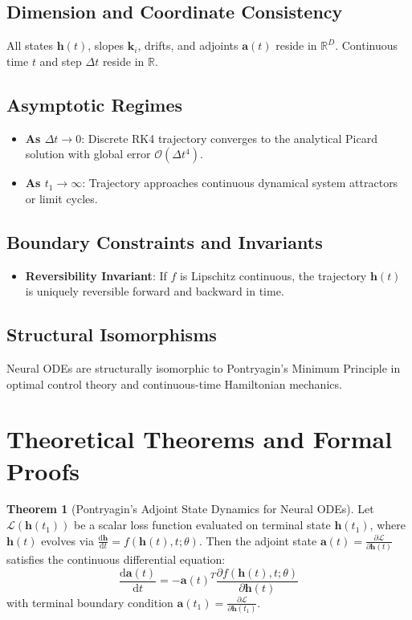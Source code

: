 \documentclass[11pt,a4paper]{article}
\theoremstyle{definition}
\newtheorem{theorem}{\textbf{Theorem}}[section]
\begin{document}
\subsection{Dimension and Coordinate Consistency}
All states $\mathbf{h}(t)$, slopes $\mathbf{k}_i$, drifts, and adjoints $\mathbf{a}(t)$ reside in $\mathbb{R}^D$. Continuous time $t$ and step $\Delta t$ reside in $\mathbb{R}$.

\subsection{Asymptotic Regimes}
\begin{itemize}
    \item \textbf{As $\Delta t \to 0$}: Discrete RK4 trajectory converges to the analytical Picard solution with global error $\mathcal{O}(\Delta t^4)$.
    \item \textbf{As $t_1 \to \infty$}: Trajectory approaches continuous dynamical system attractors or limit cycles.
\end{itemize}

\subsection{Boundary Constraints and Invariants}
\begin{itemize}
    \item \textbf{Reversibility Invariant}: If $f$ is Lipschitz continuous, the trajectory $\mathbf{h}(t)$ is uniquely reversible forward and backward in time.
\end{itemize}

\subsection{Structural Isomorphisms}
Neural ODEs are structurally isomorphic to Pontryagin's Minimum Principle in optimal control theory and continuous-time Hamiltonian mechanics.

\section{Theoretical Theorems and Formal Proofs}

\begin{theorem}[Pontryagin's Adjoint State Dynamics for Neural ODEs]
Let $\mathcal{L}(\mathbf{h}(t_1))$ be a scalar loss function evaluated on terminal state $\mathbf{h}(t_1)$, where $\mathbf{h}(t)$ evolves via $\frac{\mathrm{d}\mathbf{h}}{\mathrm{d}t} = f(\mathbf{h}(t), t; \theta)$. Then the adjoint state $\mathbf{a}(t) = \frac{\partial \mathcal{L}}{\partial \mathbf{h}(t)}$ satisfies the continuous differential equation:
{\boldmath
\begin{equation}
\frac{\mathrm{d}\mathbf{a}(t)}{\mathrm{d}t} = -\mathbf{a}(t)^T \frac{\partial f(\mathbf{h}(t), t; \theta)}{\partial \mathbf{h}(t)}
\end{equation}
}
with terminal boundary condition $\mathbf{a}(t_1) = \frac{\partial \mathcal{L}}{\partial \mathbf{h}(t_1)}$.
\end{theorem}
\end{document}
